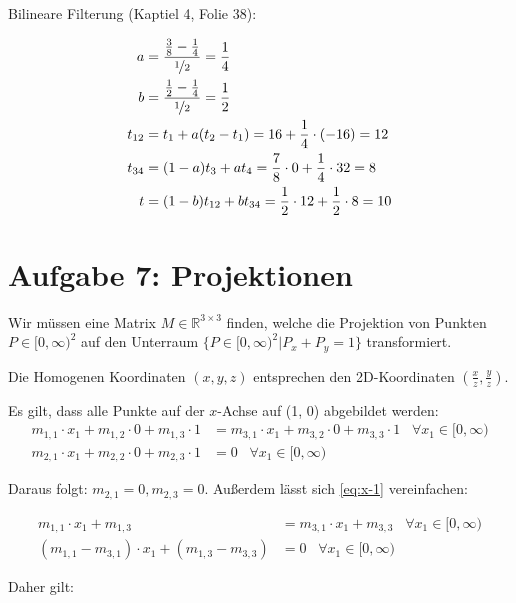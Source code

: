 \documentclass[a4paper]{scrartcl}
\begin{document}
Bilineare Filterung (Kaptiel 4, Folie 38):

\begin{align}
    a &= \frac{\frac{3}{8} - \frac{1}{4}}{\nicefrac{1}{2}} = \frac{1}{4}\\
    b &= \frac{\frac{1}{2} - \frac{1}{4}}{\nicefrac{1}{2}} = \frac{1}{2}\\
    t_{12} &= t_1 + a(t_2 - t_1) = 16 + \frac{1}{4} \cdot (-16) = 12\\
    t_{34} &= (1-a) t_3 + a t_4 = \frac{7}{8} \cdot 0 + \frac{1}{4} \cdot 32 = 8\\
    t &= (1-b) t_{12} + b t_{34} = \frac{1}{2} \cdot 12 + \frac{1}{2} \cdot 8 = 10
\end{align}

\clearpage
\section*{Aufgabe 7: Projektionen}
Wir müssen eine Matrix $M \in \mathbb{R}^{3 \times 3}$ finden, welche die
Projektion von Punkten $P \in [0, \infty)^2$ auf den Unterraum
$\{P \in [0, \infty)^2 | P_x + P_y = 1\}$ transformiert.

Die Homogenen Koordinaten $(x, y, z)$ entsprechen den 2D-Koordinaten
$(\frac{x}{z}, \frac{y}{z})$.

\goodbreak
Es gilt, dass alle Punkte auf der $x$-Achse auf (1, 0) abgebildet werden:\nobreak
\begin{align}
    m_{1,1} \cdot x_1 + m_{1,2} \cdot 0 + m_{1,3} \cdot 1 &= m_{3,1} \cdot x_1 + m_{3,2} \cdot 0 + m_{3,3} \cdot 1 \;\;\; \forall x_1 \in [0, \infty) \label{eq:x-1}\\
    m_{2,1} \cdot x_1 + m_{2,2} \cdot 0 + m_{2,3} \cdot 1 &= 0 \;\;\; \forall x_1 \in [0, \infty)
\end{align}

Daraus folgt: $m_{2,1} = 0, m_{2,3} = 0$. Außerdem lässt sich \cref{eq:x-1}
vereinfachen:

\begin{align}
    m_{1,1} \cdot x_1 +  m_{1,3} &= m_{3,1} \cdot x_1 + m_{3,3} \;\;\; \forall x_1 \in [0, \infty)\\
    (m_{1,1} - m_{3,1}) \cdot x_1 + (m_{1,3} - m_{3,3}) &= 0 \;\;\; \forall x_1 \in [0, \infty)\label{eq:x-1.1}
\end{align}

Daher gilt:
\end{document}
